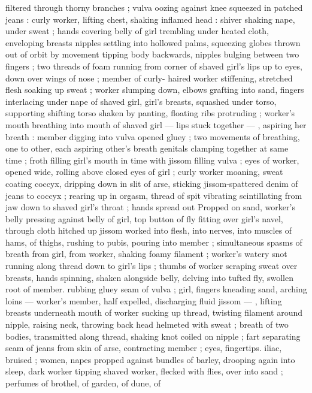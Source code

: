 filtered through thorny branches ; vulva oozing against knee 
squeezed in patched jeans : curly worker, lifting chest, shaking 
inflamed head : shiver shaking nape, under sweat ; hands covering 
belly of girl trembling under heated cloth, enveloping breasts 
nipples settling into hollowed palms, squeezing globes thrown out of 
orbit by movement tipping body backwards, nipples bulging between 
two fingers ; two threads of foam running from corner of shaved 
girl's lips up to eyes, down over wings of nose ; member of curly- 
haired worker stiffening, stretched flesh soaking up sweat ; worker 
slumping down, elbows grafting into sand, fingers interlacing under 
nape of shaved girl, girl's breasts, squashed under torso, supporting 
shifting torso shaken by panting, floating ribs protruding ; worker's 
mouth breathing into mouth of shaved girl --- lips stuck together --- 
, aspiring her breath : member digging into vulva opened gluey ; two 
movements of breathing, one to other, each aspiring other's breath 
genitals clamping together at same time ; froth filling girl's mouth in 
time with jissom filling vulva ; eyes of worker, opened wide, rolling 
above closed eyes of girl ; curly worker moaning, sweat coating 
coccyx, dripping down in slit of arse, sticking jissom-spattered denim 
of jeans to coccyx ; rearing up in orgasm, thread of spit vibrating 
scintillating from jaw down to shaved girl's throat ; hands spread out 
Propped on sand, worker's belly pressing against belly of girl, top 
button of fly fitting over girl's navel, through cloth hitched up 
jissom worked into flesh, into nerves, into muscles of hams, of 
thighs, rushing to pubis, pouring into member ; simultaneous spasms 
of breath from girl, from worker, shaking foamy filament ; worker's 
watery snot running along thread down to girl's lips ; thumbs of 
worker scraping sweat over breasts, hands spinning, shaken 
alongside belly, delving into tufted fly, swollen root of member. 
rubbing gluey seam of vulva ; girl, fingers kneading sand, arching 
loins --- worker's member, half expelled, discharging fluid jissom --- 
, lifting breasts underneath mouth of worker sucking up thread, 
twisting filament around nipple, raising neck, throwing back head 
helmeted with sweat ; breath of two bodies, transmitted along 
thread, shaking knot coiled on nipple ; fart separating seam of jeans 
from skin of arse, contracting member ; eyes, fingertips. iliac, 
bruised ; women, napes propped against bundles of barley, drooping 
again into sleep, dark worker tipping shaved worker, flecked with 
flies, over into sand ; perfumes of brothel, of garden, of dune, of 
